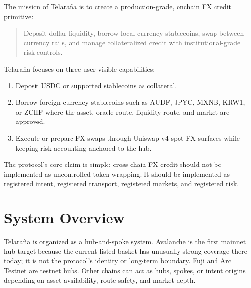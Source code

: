 \documentclass[11pt]{article}
\newcommand{\protocol}{Telara\~na}
\begin{document}
The mission of \protocol{} is to create a production-grade, onchain FX credit
primitive:

\begin{quote}
Deposit dollar liquidity, borrow local-currency stablecoins, swap between
currency rails, and manage collateralized credit with institutional-grade risk
controls.
\end{quote}

\protocol{} focuses on three user-visible capabilities:

\begin{enumerate}
  \item Deposit USDC or supported stablecoins as collateral.
  \item Borrow foreign-currency stablecoins such as AUDF, JPYC, MXNB, KRW1, or
        ZCHF where the asset, oracle route, liquidity route, and market are
        approved.
  \item Execute or prepare FX swaps through Uniswap v4 spot-FX surfaces while
        keeping risk accounting anchored to the hub.
\end{enumerate}

The protocol's core claim is simple: cross-chain FX credit should not be
implemented as uncontrolled token wrapping. It should be implemented as
registered intent, registered transport, registered markets, and registered
risk.

\section{System Overview}

\protocol{} is organized as a hub-and-spoke system. Avalanche is the first
mainnet hub target because the current listed basket has unusually strong
coverage there today; it is not the protocol's identity or long-term boundary.
Fuji and Arc Testnet are testnet hubs. Other chains can act as hubs, spokes, or
intent origins depending on asset availability, route safety, and market depth.
\end{document}

